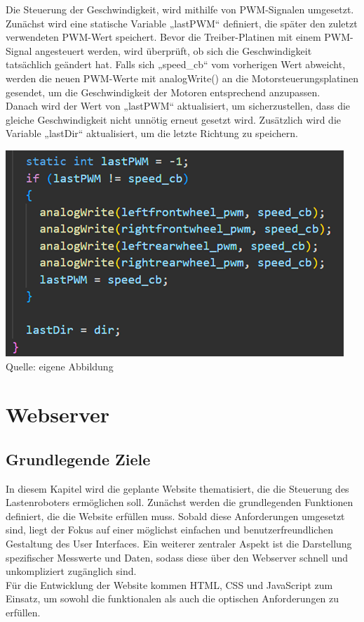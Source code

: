 \documentclass[ngerman,12pt,a4paper]{article}
\begin{document}
	Die Steuerung der Geschwindigkeit, wird mithilfe von PWM-Signalen umgesetzt. Zunächst wird eine statische Variable „lastPWM“ definiert, die später den zuletzt verwendeten PWM-Wert speichert. Bevor die Treiber-Platinen mit einem PWM-Signal angesteuert werden, wird überprüft, ob sich die Geschwindigkeit tatsächlich geändert hat. Falls sich „speed\_cb“ vom vorherigen Wert abweicht, werden die neuen PWM-Werte mit analogWrite() an die Motorsteuerungsplatinen gesendet, um die Geschwindigkeit der Motoren entsprechend anzupassen. \\
	\newpage 	\noindent
	Danach wird der Wert von „lastPWM“ aktualisiert, um sicherzustellen, dass die gleiche Geschwindigkeit nicht unnötig erneut gesetzt wird. Zusätzlich wird die Variable „lastDir“ aktualisiert, um die letzte Richtung zu speichern. \\[0.5cm]
	\begin{minipage}{\textwidth}
		\centering
		\includegraphics[scale=1.2]{Pictures/code_analogWrite_pwm_motoren}
		\label{fig:code_analogWrite_pwm_motoren}
		\vspace{-2pt}
		\small Quelle: eigene Abbildung
		\vspace{10pt}
	\end{minipage}
	\newpage
	\section{Webserver} %
	 
		\subsection{Grundlegende Ziele}
	In diesem Kapitel wird die geplante Website thematisiert, die die Steuerung des Lastenroboters ermöglichen soll. Zunächst werden die grundlegenden Funktionen definiert, die die Website erfüllen muss. Sobald diese Anforderungen umgesetzt sind, liegt der Fokus auf einer möglichst einfachen und benutzerfreundlichen Gestaltung des User Interfaces. Ein weiterer zentraler Aspekt ist die Darstellung spezifischer Messwerte und Daten, sodass diese über den Webserver schnell und unkompliziert zugänglich sind. \\[0.5cm]
	Für die Entwicklung der Website kommen HTML, CSS und JavaScript zum Einsatz, um sowohl die funktionalen als auch die optischen Anforderungen zu erfüllen. 
	
\end{document}
